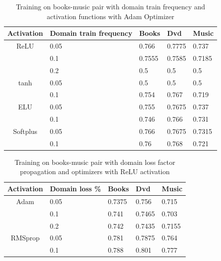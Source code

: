 \documentclass[11pt,a4paper]{article}
\begin{document}
\begin{table}[h]
\begin{center}
\begin{tabular}{|c|l|l|l|l|}
\hline
Activation & \multicolumn{1}{|p{1cm}|}{Domain train frequency}& Books & Dvd & Music \\
\hline
ReLU & 0.05 & 0.766 & 0.7775 & 0.737 \\
  & 0.1 & 0.7555 & 0.7585 & 0.7185 \\
  & 0.2 & 0.5 & 0.5 & 0.5 \\
\hline
tanh & 0.05 & 0.5 & 0.5 & 0.5  \\
  & 0.1 & 0.754 & 0.767 & 0.719 \\
\hline
ELU & 0.05 & 0.755 & 0.7675 & 0.737 \\
  & 0.1 & 0.746 & 0.766 & 0.731 \\
\hline
Softplus & 0.05 & 0.766 & 0.7675 & 0.7315 \\
  & 0.1 & 0.76 & 0.768 & 0.721 \\
\hline
\end{tabular}
\end{center}
\caption{ Training on books-music pair with domain train frequency and activation functions with Adam Optimizer}
\label{1d-activation-table}
\end{table}

\begin{table}[h]
\begin{center}
\begin{tabular}{|c|l|l|l|l|}
\hline
Activation & \multicolumn{1}{|p{1cm}|}{Domain loss \%}& Books & Dvd & Music \\
\hline
Adam & 0.05 & 0.7375 & 0.756 & 0.715 \\
 & 0.1 & 0.741 & 0.7465 & 0.703 \\
 & 0.2 & 0.742 & 0.7435 & 0.7155 \\
\hline
RMSprop & 0.05 & 0.781 & 0.7875 & 0.764 \\
 & 0.1 & 0.788 & 0.801 & 0.777 \\
\hline
\end{tabular}
\end{center}
\caption{ Training on books-music pair with domain loss factor propagation and optimizers with ReLU activation}
\label{alpha-optimizer-table}
\end{table}
\end{document}

